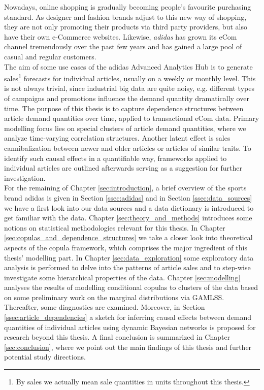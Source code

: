 

Nowadays, online shopping is gradually becoming people's favourite purchasing standard. As designer and fashion brands adjust to this new way of shopping, they are not only promoting their products via third party 	providers, but also have their own e-Commerce websites. Likewise, \textit{adidas} has grown its eCom channel tremendously over the past few years and has gained a large pool of casual and regular customers.
\\

The aim of some use cases of the adidas Advanced Analytics Hub is to generate sales\footnote{By sales we actually mean sale quantities in units throughout this thesis.} forecasts for individual articles, usually on a weekly or monthly level. This is not always trivial, since industrial big data are quite noisy, e.g. different types of campaigns and promotions influence the demand quantity dramatically over time. The purpose of this thesis is to capture dependence structures between article demand quantities over time, applied to transactional eCom data. Primary modelling focus lies on special clusters of article demand quantities, where we analyze time-varying correlation structures. Another latent effect is sales cannibalization between newer and older articles or articles of similar traits. To identify such causal effects in a quantifiable way, frameworks applied to individual articles are outlined afterwards serving as a suggestion for further investigation.
\\

For the remaining of Chapter \ref{sec:introduction}, a brief overview of the sports brand adidas is given in Section \ref{ssec:adidas} and in Section \ref{ssec:data_sources} we have a first look into our data sources and a data dictionary is introduced to get familiar with the data. Chapter \ref{sec:theory_and_methods} introduces some notions on statistical methodologies relevant for this thesis. In Chapter \ref{sec:copulas_and_dependence_structures} we take a closer look into theoretical aspects of the copula framework, which comprises the major ingredient of this thesis' modelling part. In Chapter \ref{sec:data_exploration} some exploratory data analysis is performed to delve into the patterns of article sales and to step-wise investigate some hierarchical properties of the data.  Chapter \ref{sec:modelling} analyses the results of modelling conditional copulas to clusters of the data based on some preliminary work on the marginal distributions via GAMLSS. Thereafter, some diagnostics are examined. Moreover, in Section \ref{ssec:article_dependencies} a sketch for inferring causal effects between demand quantities of individual articles using dynamic Bayesian networks is proposed for research beyond this thesis. A final conclusion is summarized in Chapter \ref{sec:conclusion}, where we point out the main findings of this thesis and further potential study directions.




